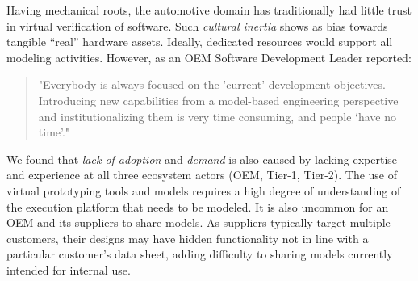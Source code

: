 Having mechanical roots, the automotive domain has traditionally had little 
trust in virtual verification of software.
Such \emph{cultural inertia} %
shows as bias towards tangible ``real'' hardware assets.
Ideally, dedicated resources would support all modeling activities.
However, as an OEM Software Development Leader reported:

\begin{quote}
"Everybody is always focused on the 'current' development objectives.
Introducing new capabilities from a model-based engineering perspective and institutionalizing them is very time consuming, and people ‘have no time’." 
\end{quote}

We found that \emph{lack of adoption} and \emph{demand} 
is also caused by lacking expertise and experience at all three ecosystem actors (OEM, Tier-1, Tier-2).
The use of virtual prototyping tools and models requires a high degree of understanding of the execution platform that needs to be modeled.
%
%
It is also uncommon for an OEM and its suppliers to share models.
As suppliers typically target multiple customers, their designs may have hidden functionality not in line with a particular customer’s data sheet,
adding difficulty to sharing models currently intended for internal use.

